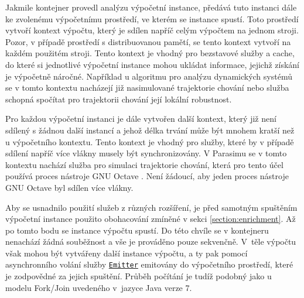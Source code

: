 Jakmile kontejner provedl analýzu výpočetní instance, předává tuto instanci dále
ke zvolenému výpočetnímu prostředí, ve kterém se instance spustí. Toto prostředí
vytvoří kontext výpočtu, který je sdílen napříč celým výpočtem na
jednom stroji. Pozor, v případě prostředí s distribuovanou pamětí, se tento kontext
vytvoří na každém použitém stroji. Tento kontext je vhodný pro bezstavové služby
a cache, do které si jednotlivé výpočetní instance mohou ukládat informace, jejichž
získání je vý\-po\-čet\-ně náročné. Například u algoritmu pro analýzu dynamických systémů
se v tomto kontextu nacházejí již nasimulované trajektorie chování nebo služba schopná spočítat
pro trajektorii chování její lokální robustnost.

Pro každou výpočetní instanci je dále vytvořen další kontext, který již není sdílený
s žádnou další instancí a jehož délka trvání může být  mnohem kratší než u výpočetního kontextu.
Tento kontext je vhodný pro služby, které by v případě sdílení napříč více vlákny musely
být synchronizovány. V Parasimu se v tomto kontextu nachází služba pro simulaci trajektorie
chování, která pro tento účel používá proces nástroje GNU Octave \cite{eaton2008}. Není
žádoucí, aby jeden proces nástroje GNU Octave byl sdílen více vlákny. 

Aby se usnadnilo použití služeb z různých rozšíření, je před samotným spuštěním výpočetní
instance použito obohacování zmíněné v sekci \ref{section:enrichment}. Až po tomto bodu
se instance výpočtu spustí. Do této chvíle se v kontejneru nenachází žádná souběžnost
a vše je prováděno pouze sekvenčně. V~těle výpočtu však mohou být vytvářeny další instance výpočtu,
a ty pak pomocí asynchronního volání služby \href{https://github.com/sybila/parasim/blob/2.0.0.Final/extensions/computation-lifecycle-api/src/main/java/org/sybila/parasim/computation/lifecycle/api/Emitter.java}{\texttt{Emitter}} emitovány do výpočetního prostředí, které je zodpovědné za jejich spuštění.
Průběh počítání je tudíž podobný jako u modelu Fork/Join \cite{lea2000} uvedeného v~jazyce Java verze 7.

